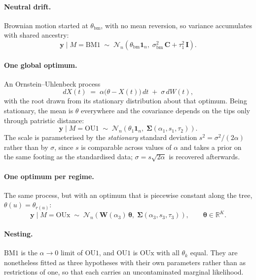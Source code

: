 \documentclass[11pt]{article}
\newcommand{\yv}{\mathbf{y}}
\newcommand{\Cm}{\mathbf{C}}
\newcommand{\Idm}{\mathbf{I}}
\newcommand{\Wm}{\mathbf{W}}
\newcommand{\one}{\mathbf{1}}
\newcommand{\thetav}{\boldsymbol{\theta}}
\newcommand{\Sig}{\boldsymbol{\Sigma}}
\newcommand{\BM}{\mathrm{BM1}}
\newcommand{\OUo}{\mathrm{OU1}}
\newcommand{\OUx}{\mathrm{OUx}}
\begin{document}
\paragraph{Neutral drift.}
Brownian motion started at $\theta_{\mathrm{bm}}$, with no mean reversion, so variance accumulates
with shared ancestry:
\begin{equation}
\yv \mid M = \BM \;\sim\; \mathcal{N}_{n}\!\left(\theta_{\mathrm{bm}}\one_{n},\;
   \sigma_{\mathrm{bm}}^{2}\,\Cm + \tau_{1}^{2}\,\Idm\right).
\end{equation}

\paragraph{One global optimum.}
An Ornstein--Uhlenbeck process
\begin{equation}
dX(t) \;=\; \alpha\bigl(\theta - X(t)\bigr)\,dt \;+\; \sigma\,dW(t),
\label{eq:ou}
\end{equation}
with the root drawn from its stationary distribution about that optimum. Being stationary, the mean
is $\theta$ everywhere and the covariance depends on the tips only through patristic distance:
\begin{equation}
\yv \mid M = \OUo \;\sim\; \mathcal{N}_{n}\!\left(\theta_{1}\one_{n},\; \Sig(\alpha_{1}, s_{1}, \tau_{2})\right).
\end{equation}
The scale is parameterised by the \emph{stationary} standard deviation $s^{2} = \sigma^{2}/(2\alpha)$
rather than by $\sigma$, since $s$ is comparable across values of $\alpha$ and takes a prior on the
same footing as the standardised data; $\sigma = s\sqrt{2\alpha}$ is recovered afterwards.

\paragraph{One optimum per regime.}
The same process, but with an optimum that is piecewise constant along the tree,
$\theta(u) = \theta_{r(u)}$:
\begin{equation}
\yv \mid M = \OUx \;\sim\; \mathcal{N}_{n}\!\left(\Wm(\alpha_{3})\,\thetav,\; \Sig(\alpha_{3}, s_{3}, \tau_{3})\right),
\qquad \thetav \in \mathbb{R}^{K}.
\label{eq:oux}
\end{equation}

\paragraph{Nesting.}
$\BM$ is the $\alpha \to 0$ limit of $\OUo$, and $\OUo$ is $\OUx$ with all $\theta_k$ equal. They are
nonetheless fitted as three hypotheses with their own parameters rather than as restrictions of one,
so that each carries an uncontaminated marginal likelihood.
\end{document}
